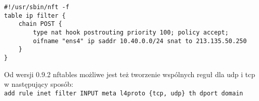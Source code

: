 \begin{Verbatim}
#!/usr/sbin/nft -f
table ip filter {
	chain POST {
		type nat hook postrouting priority 100; policy accept;
		oifname "ens4" ip saddr 10.40.0.0/24 snat to 213.135.50.250
	}
}
\end{Verbatim}

\vspace{5pt}\noindent
Od wersji 0.9.2 nftables możliwe jest też tworzenie wspólnych reguł dla udp i tcp w następujący sposób:
\\\Verb$add rule inet filter INPUT meta l4proto {tcp, udp} th dport domain$

